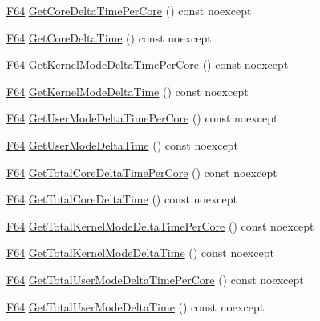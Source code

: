 \begin{DoxyCompactItemize}
\hyperlink{namespacemage_ad26233bbec640deda836e572c1a23708}{F64} \hyperlink{classmage_1_1_c_p_u_timer_a2b088ff4194fd2a5fd7201e8de4dd1da}{Get\+Core\+Delta\+Time\+Per\+Core} () const noexcept
\item 
\hyperlink{namespacemage_ad26233bbec640deda836e572c1a23708}{F64} \hyperlink{classmage_1_1_c_p_u_timer_a5d033c20772755d6a6693e1b495cf589}{Get\+Core\+Delta\+Time} () const noexcept
\item 
\hyperlink{namespacemage_ad26233bbec640deda836e572c1a23708}{F64} \hyperlink{classmage_1_1_c_p_u_timer_a7c503d9d66548e74ea29d887ee1ddcd3}{Get\+Kernel\+Mode\+Delta\+Time\+Per\+Core} () const noexcept
\item 
\hyperlink{namespacemage_ad26233bbec640deda836e572c1a23708}{F64} \hyperlink{classmage_1_1_c_p_u_timer_a806439a1ca61d81c877e9823b9cb0705}{Get\+Kernel\+Mode\+Delta\+Time} () const noexcept
\item 
\hyperlink{namespacemage_ad26233bbec640deda836e572c1a23708}{F64} \hyperlink{classmage_1_1_c_p_u_timer_a8838f9a875f227c6783e107986c0adfc}{Get\+User\+Mode\+Delta\+Time\+Per\+Core} () const noexcept
\item 
\hyperlink{namespacemage_ad26233bbec640deda836e572c1a23708}{F64} \hyperlink{classmage_1_1_c_p_u_timer_aa6873914da66a6be49ff69253f236f3e}{Get\+User\+Mode\+Delta\+Time} () const noexcept
\item 
\hyperlink{namespacemage_ad26233bbec640deda836e572c1a23708}{F64} \hyperlink{classmage_1_1_c_p_u_timer_af098c9df9e25e29beee131bb1de8c482}{Get\+Total\+Core\+Delta\+Time\+Per\+Core} () const noexcept
\item 
\hyperlink{namespacemage_ad26233bbec640deda836e572c1a23708}{F64} \hyperlink{classmage_1_1_c_p_u_timer_adb10ccea8664d1400d88953192a5a111}{Get\+Total\+Core\+Delta\+Time} () const noexcept
\item 
\hyperlink{namespacemage_ad26233bbec640deda836e572c1a23708}{F64} \hyperlink{classmage_1_1_c_p_u_timer_ab1128ed37f45445afdfc6d539d721616}{Get\+Total\+Kernel\+Mode\+Delta\+Time\+Per\+Core} () const noexcept
\item 
\hyperlink{namespacemage_ad26233bbec640deda836e572c1a23708}{F64} \hyperlink{classmage_1_1_c_p_u_timer_a38cb7adfd830f9d8c7a567f30ebcdf24}{Get\+Total\+Kernel\+Mode\+Delta\+Time} () const noexcept
\item 
\hyperlink{namespacemage_ad26233bbec640deda836e572c1a23708}{F64} \hyperlink{classmage_1_1_c_p_u_timer_a7eb10c5f750f03ad5e19f0b29ee4851c}{Get\+Total\+User\+Mode\+Delta\+Time\+Per\+Core} () const noexcept
\item 
\hyperlink{namespacemage_ad26233bbec640deda836e572c1a23708}{F64} \hyperlink{classmage_1_1_c_p_u_timer_aeff891594a11dba36c73442d04a430c8}{Get\+Total\+User\+Mode\+Delta\+Time} () const noexcept
\end{DoxyCompactItemize}
